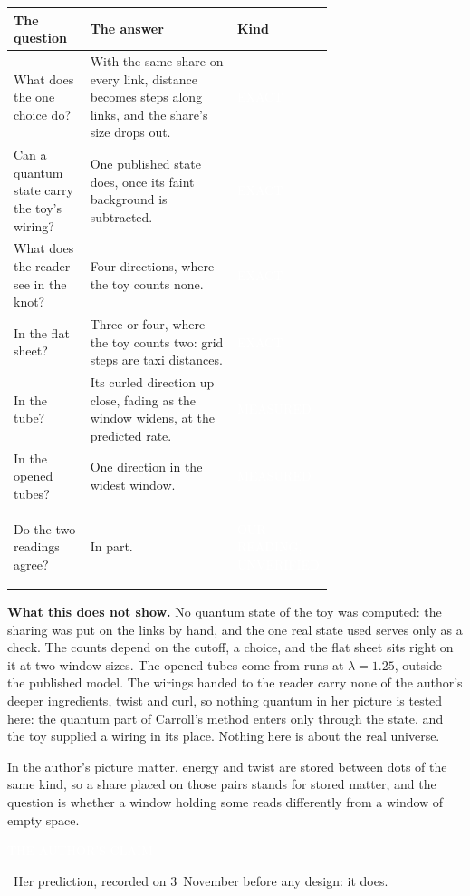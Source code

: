 \documentclass[11pt,letterpaper]{article}
\newcommand{\sub}[1]{\par\medskip{\color{ink}\large\bfseries #1}\par}
\newcommand{\tagbox}[2]{{\sffamily\scriptsize\colorbox{#1}{\textcolor{white}{\strut #2}}}}
\newcommand{\Exact}{\tagbox{kExact}{EXACT}}
\newcommand{\Meas}{\tagbox{kMeas}{MEASURED}}
\newcommand{\Ours}{\tagbox{kOurs}{OUR READING, UNVERIFIED}}
\newcommand{\Claim}{\tagbox{kClaim}{THE AUTHOR'S CLAIM}}
\begin{document}
\begin{center}
\renewcommand{\arraystretch}{1.25}
\begin{tabular}{@{}p{0.24\linewidth}p{0.46\linewidth}l@{}}
\toprule
The question & The answer & Kind \\
\midrule
What does the one choice do? & With the same share on every link, distance becomes steps along links, and the share's size drops out. & \Exact \\
Can a quantum state carry the toy's wiring? & One published state does, once its faint background is subtracted. & \Exact \\
What does the reader see in the knot? & Four directions, where the toy counts none. & \Exact \\
In the flat sheet? & Three or four, where the toy counts two: grid steps are taxi distances. & \Exact \\
In the tube? & Its curled direction up close, fading as the window widens, at the predicted rate. & \Meas \\
In the opened tubes? & One direction in the widest window. & \Meas \\
Do the two readings agree? & In part. & \Ours \\
\bottomrule
\end{tabular}
\end{center}

\textbf{What this does not show.} No quantum state of the toy was computed: the sharing was put on the
links by hand, and the one real state used serves only as a check. The counts depend on the cutoff, a
choice, and the flat sheet sits right on it at two window sizes. The opened tubes come from runs at
$\lambda = 1.25$, outside the published model. The wirings handed to the reader carry none of the author's
deeper ingredients, twist and curl, so nothing quantum in her picture is tested here: the quantum part of
Carroll's method enters only through the state, and the toy supplied a wiring in its place. Nothing here is
about the real universe.

\sub{A window with matter in it}
In the author's picture matter, energy and twist are stored between dots of the same kind, so a share placed
on those pairs stands for stored matter, and the question is whether a window holding some reads differently
from a window of empty space. \Claim\ Her prediction, recorded on 3~November before any design: it does.
\end{document}
